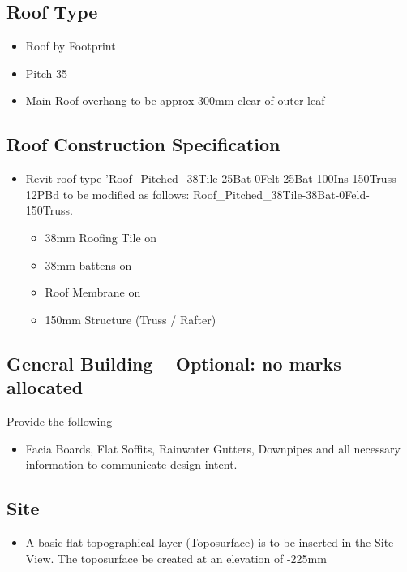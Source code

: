 \subsection*{Roof Type}
\begin{itemize}
	\item Roof by Footprint
	\item Pitch 35\degree
	\item Main Roof overhang to be approx 300mm clear of outer leaf	
\end{itemize}



\subsection*{Roof Construction Specification}
\begin{itemize}
	\item Revit roof type 'Roof\_Pitched\_38Tile-25Bat-0Felt-25Bat-100Ins-150Truss-12PBd to be modified as follows: Roof\_Pitched\_38Tile-38Bat-0Feld-150Truss.
	\begin{itemize}
		\item 38mm Roofing Tile on 
		\item 38mm battens on 
		\item Roof Membrane on 
		\item 150mm Structure (Truss / Rafter)
	\end{itemize}
\end{itemize}




\subsection*{General Building -- Optional: no marks allocated}
Provide the following
\begin{itemize}
	\item Facia Boards, Flat Soffits, Rainwater Gutters, Downpipes and all necessary information to communicate design intent.
\end{itemize}


\subsection*{Site}
\begin{itemize}
	\item A basic flat topographical layer (Toposurface) is to be inserted in the Site View.  The toposurface be created at an elevation of -225mm
\end{itemize}


